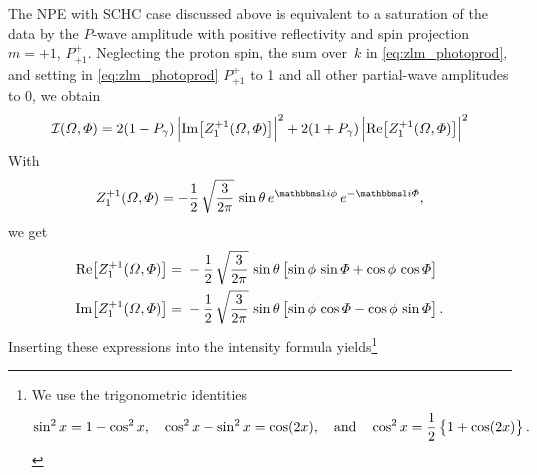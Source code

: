 The NPE with SCHC case discussed above is equivalent to a saturation
of the data by the $P$-wave amplitude with positive reflectivity and
spin projection $m = +1$, \ie $P^+_{+1}$.  Neglecting the proton spin,
\ie the sum over~$k$ in \cref{eq:zlm_photoprod}, and setting in
\cref{eq:zlm_photoprod} $P^+_{+1}$ to 1 and all other partial-wave
amplitudes to 0, we obtain
\begin{equation}
  \intensity(\Omega, \Phi)
  = 2 (1 - P_\gamma)\, \Abs[2]{\Im[1]{Z_1^{+1}(\Omega, \Phi)}}^2
  + 2 (1 + P_\gamma)\, \Abs[2]{\Re[1]{Z_1^{+1}(\Omega, \Phi)}}^2
\end{equation}
With
\begin{equation}
  Z_1^{+1}(\Omega, \Phi)
  = -\frac{1}{2}\, \sqrt{\frac{3}{2 \pi}}\, \sin \theta\, e^{\imag \phi}\, e^{-\imag \Phi},
\end{equation}
we get
\begin{align}
  \Re[1]{Z_1^{+1}(\Omega, \Phi)}
  ={}& -\frac{1}{2}\, \sqrt{\frac{3}{2 \pi}}\, \sin \theta \sBrk[1]{\sin \phi\, \sin \Phi + \cos \phi\, \cos \Phi}
  \\
  \Im[1]{Z_1^{+1}(\Omega, \Phi)}
  ={}& -\frac{1}{2}\, \sqrt{\frac{3}{2 \pi}}\, \sin \theta \sBrk[1]{\sin \phi\, \cos \Phi - \cos \phi\, \sin \Phi}.
\end{align}
Inserting these expressions into the intensity formula yields\footnote{%
  We use the trigonometric identities
  \begin{equation}
    \sin^2 x
    = 1 - \cos^2 x,
    \quad
    \cos^2 x - \sin^2 x
    = \cos(2 x),
    \quad\text{and}\quad
    \cos^2 x
    = \frac{1}{2}\cBrk{1 + \cos(2 x)}.
  \end{equation}
}
